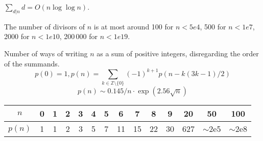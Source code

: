\documentclass{article}
\begin{document}
\begin{multicols}{2}
	$\sum_{d|n} d = O(n \log \log n).$
	
	The number of divisors of $n$ is at most around 100 for $n < 5e4$, 500 for $n < 1e7$, 2000 for $n < 1e10$, 200\,000 for $n < 1e19$.
	
	\columnbreak
	
	Number of ways of writing $n$ as a sum of positive integers, disregarding the order of the summands.
	$$ p(0) = 1,  p(n) = \sum_{k \in \mathbb{Z} \setminus \{0\}} (-1)^{k+1} p(n - k(3k-1) / 2) $$
	\[ p(n) \sim 0.145 / n \cdot \exp(2.56 \sqrt{n}) \]
	
	\begin{center}
		\begin{tabular}{c|c@{\ }c@{\ }c@{\ }c@{\ }c@{\ }c@{\ }c@{\ }c@{\ }c@{\ }c@{\ }c@{\ }c@{\ }c}
			$n$    & 0 & 1 & 2 & 3 & 4 & 5 & 6  & 7  & 8  & 9  & 20  & 50  & 100 \\ \hline
			$p(n)$ & 1 & 1 & 2 & 3 & 5 & 7 & 11 & 15 & 22 & 30 & 627 & $\mathtt{\sim}$2e5 & $\mathtt{\sim}$2e8 \\
		\end{tabular}
	\end{center}
	
\end{multicols}
\end{document}
